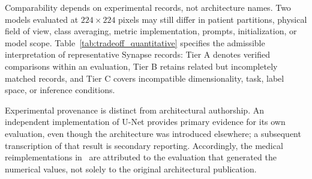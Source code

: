 \documentclass[5p,times,authoryear]{elsarticle}
\begin{document}
Comparability depends on experimental records, not architecture names. Two models evaluated at $224\times224$ pixels may still differ in patient partitions, physical field of view, class averaging, metric implementation, prompts, initialization, or model scope. Table~\ref{tab:tradeoff_quantitative} specifies the admissible interpretation of representative Synapse records: Tier A denotes verified comparisons within an evaluation, Tier B retains related but incompletely matched records, and Tier C covers incompatible dimensionality, task, label space, or inference conditions.

Experimental provenance is distinct from architectural authorship. An independent implementation of U-Net provides primary evidence for its own evaluation, even though the architecture was introduced elsewhere; a subsequent transcription of that result is secondary reporting. Accordingly, the medical reimplementations in~\citet{azad2024unet_verified} are attributed to the evaluation that generated the numerical values, not solely to the original architectural publication.
\end{document}
